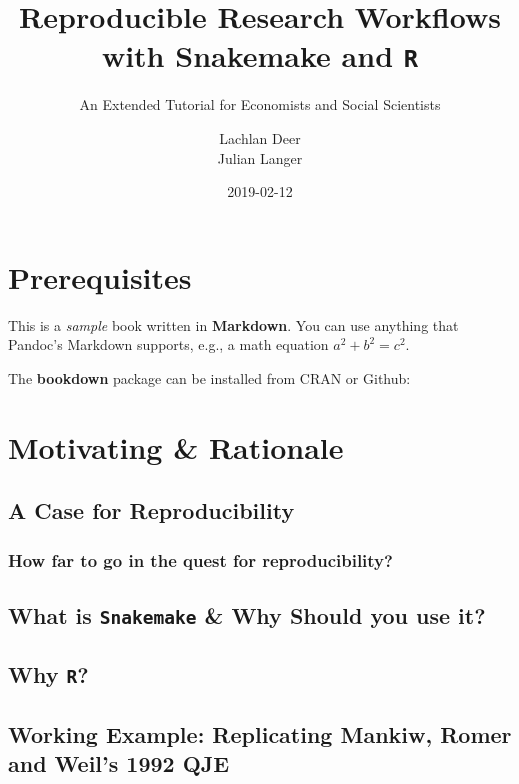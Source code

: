 \documentclass[]{book}
\title{Reproducible Research Workflows with Snakemake and \texttt{R}}
\subtitle{An Extended Tutorial for Economists and Social Scientists}
\author{Lachlan Deer \\ Julian Langer}
\date{2019-02-12}
\theoremstyle{definition}
\theoremstyle{definition}
\theoremstyle{definition}
\theoremstyle{remark}
\begin{document}
\maketitle

{
\setcounter{tocdepth}{1}
\tableofcontents
}
\chapter*{Prerequisites}\label{prerequisites}

This is a \emph{sample} book written in \textbf{Markdown}. You can use
anything that Pandoc's Markdown supports, e.g., a math equation
\(a^2 + b^2 = c^2\).

The \textbf{bookdown} package can be installed from CRAN or Github:

\chapter{Motivating \& Rationale}\label{intro}

\section{A Case for Reproducibility}\label{a-case-for-reproducibility}

\subsection{How far to go in the quest for
reproducibility?}\label{how-far-to-go-in-the-quest-for-reproducibility}

\section{\texorpdfstring{What is \texttt{Snakemake} \& Why Should you
use
it?}{What is Snakemake \& Why Should you use it?}}\label{what-is-snakemake-why-should-you-use-it}

\section{\texorpdfstring{Why \texttt{R}?}{Why R?}}\label{why-r}

\section{Working Example: Replicating Mankiw, Romer and Weil's 1992
QJE}\label{working-example-replicating-mankiw-romer-and-weils-1992-qje}
\end{document}
